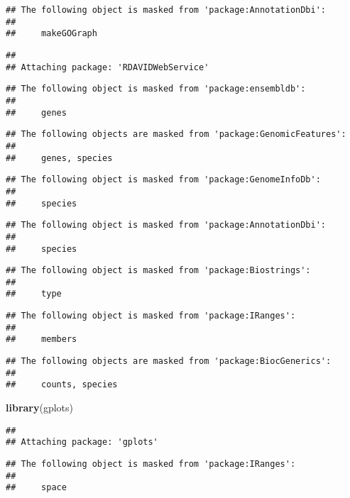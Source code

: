 \documentclass[]{article}
\newenvironment{Shaded}{\begin{snugshade}}{\end{snugshade}}
\newcommand{\KeywordTok}[1]{\textcolor[rgb]{0.13,0.29,0.53}{\textbf{#1}}}
\newcommand{\NormalTok}[1]{#1}
\begin{document}
\begin{verbatim}
## The following object is masked from 'package:AnnotationDbi':
## 
##     makeGOGraph
\end{verbatim}

\begin{verbatim}
## 
## Attaching package: 'RDAVIDWebService'
\end{verbatim}

\begin{verbatim}
## The following object is masked from 'package:ensembldb':
## 
##     genes
\end{verbatim}

\begin{verbatim}
## The following objects are masked from 'package:GenomicFeatures':
## 
##     genes, species
\end{verbatim}

\begin{verbatim}
## The following object is masked from 'package:GenomeInfoDb':
## 
##     species
\end{verbatim}

\begin{verbatim}
## The following object is masked from 'package:AnnotationDbi':
## 
##     species
\end{verbatim}

\begin{verbatim}
## The following object is masked from 'package:Biostrings':
## 
##     type
\end{verbatim}

\begin{verbatim}
## The following object is masked from 'package:IRanges':
## 
##     members
\end{verbatim}

\begin{verbatim}
## The following objects are masked from 'package:BiocGenerics':
## 
##     counts, species
\end{verbatim}

\begin{Shaded}
\begin{Highlighting}[]
\KeywordTok{library}\NormalTok{(gplots)}
\end{Highlighting}
\end{Shaded}

\begin{verbatim}
## 
## Attaching package: 'gplots'
\end{verbatim}

\begin{verbatim}
## The following object is masked from 'package:IRanges':
## 
##     space
\end{verbatim}
\end{document}
